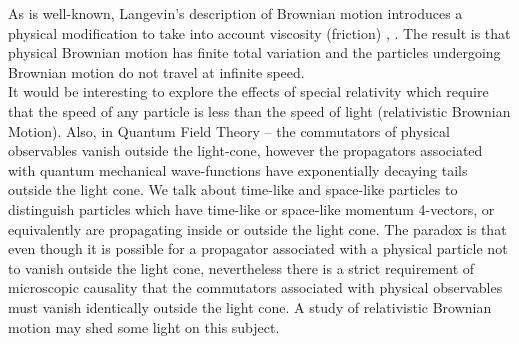 As is well-known, Langevin's description of Brownian motion introduces a physical  modification to take into account viscosity (friction) \cite{Sjogren}, \cite{CalTech}. The result is that physical Brownian motion has finite total variation and the particles undergoing Brownian motion do not 
travel at infinite speed.\\

 It would be interesting to explore the effects of special relativity which require that the speed of any particle is less than the speed of light (relativistic Brownian Motion).  Also, in Quantum Field Theory -- the commutators of physical observables vanish outside the light-cone, however the propagators associated with quantum mechanical wave-functions have exponentially decaying tails outside the light cone. We talk about time-like and space-like particles to distinguish particles which have time-like or space-like momentum 4-vectors, or equivalently are propagating inside or outside the light cone. The paradox is that even though it is possible for a propagator associated with a physical particle not to vanish outside the light cone, nevertheless there is a strict requirement of microscopic causality that the commutators associated with physical observables must vanish identically outside the light cone. A study of relativistic Brownian motion may shed some light on this subject.